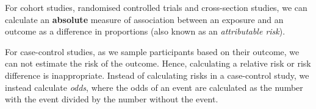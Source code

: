 \documentclass[
]{memoir}
\begin{document}
For cohort studies, randomised controlled trials and cross-section studies, we can calculate an \textbf{absolute} measure of association between an exposure and an outcome as a difference in proportions (also known as an \emph{attributable risk}).

For case-control studies, as we sample participants based on their outcome, we can not estimate the risk of the outcome. Hence, calculating a relative risk or risk difference is inappropriate. Instead of calculating risks in a case-control study, we instead calculate \emph{odds}, where the odds of an event are calculated as the number with the event divided by the number without the event.

 
  \providecommand{\huxb}[2]{\arrayrulecolor[RGB]{#1}\global\arrayrulewidth=#2pt}
  \providecommand{\huxvb}[2]{\color[RGB]{#1}\vrule width #2pt}
  \providecommand{\huxtpad}[1]{\rule{0pt}{#1}}
  \providecommand{\huxbpad}[1]{\rule[-#1]{0pt}{#1}}
\end{document}
